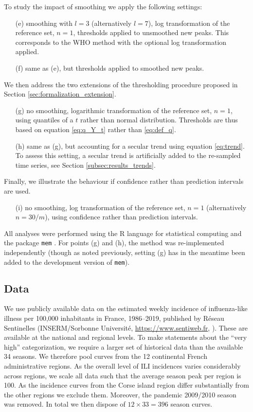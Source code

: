\documentclass[12pt]{article}
\begin{document}
\noindent To study the impact of smoothing we apply the following settings:
\begin{enumerate}
\item[(e)] smoothing with $l = 3$ (alternatively $l = 7$), log transformation of the reference set, $n = 1$, thresholds applied to unsmoothed new peaks. This corresponds to the WHO method with the optional log transformation applied.
\item[(f)] same as (e), but thresholds applied to smoothed new peaks.
\end{enumerate}
We then address the two extensions of the thresholding procedure proposed in Section \ref{sec:formalization_extension}.
\begin{enumerate}
\item[(g)] no smoothing, logarithmic transformation of the reference set, $n = 1$, using quantiles of a $t$ rather than normal distribution. Thresholds are thus based on equation \eqref{eq:q_Y_t} rather than \eqref{eq:def_q}.
\item[(h)] same as (g), but accounting for a secular trend using equation \eqref{eq:trend}. To assess this setting, a secular trend is artificially added to the re-sampled time series, see Section \ref{subsec:results_trends}.
\end{enumerate}
Finally, we illustrate the behaviour if confidence rather than prediction intervals are used.
\begin{enumerate}
\item[(i)] no smoothing, log transformation of the reference set, $n = 1$ (alternatively $n = 30/m$), using confidence rather than prediction intervals.
\end{enumerate}
All analyses were performed using the R language for statistical computing \citep{RCT2020} and the package \texttt{mem} \citep{Lozano2020}. For points (g) and (h), the method was re-implemented independently (though as noted previously, setting (g) has in the meantime been added to the development version of \texttt{mem}).

\subsection{Data}
\label{subsec:data}

We use publicly available data on the estimated weekly incidence of influenza-like illness per 100,000 inhabitants in France, 1986--2019, published by Réseau Sentinelles (INSERM/Sorbonne Université, \url{https://www.sentiweb.fr}, \citealt{Flahault2006}). These are available at the national and regional levels. To make statements about the ``very high'' categorization, we require a larger set of historical data than the available 34 seasons. We therefore pool curves from the 12 continental French administrative regions. As the overall level of ILI incidences varies considerably across regions, we scale all data such that the average season peak per region is 100. As the incidence curves from the Corse island region differ substantially from the other regions we exclude them. Moreover, the pandemic 2009/2010 season was removed. In total we then dispose of $12 \times 33 = 396$ season curves.
\end{document}
